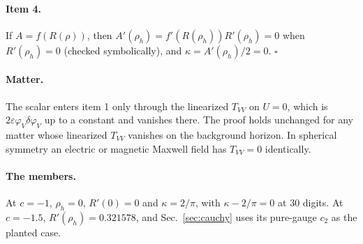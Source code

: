 \documentclass[11pt]{article}
\theoremstyle{plain}
\newcommand{\eps}{\varepsilon}
\begin{document}
\paragraph{Item 4.} If $A=f(R(\rho))$, then $A'(\rho_h)=f'(R(\rho_h))R'(\rho_h)=0$ when $R'(\rho_h)=0$ (checked symbolically),
and $\kappa=A'(\rho_h)/2=0$. $\square$

\paragraph{Matter.} The scalar enters item 1 only through the linearized $T_{VV}$ on $U=0$, which is
$2\eps\varphi_V\delta\varphi_V$ up to a constant and vanishes there. The proof holds unchanged for any matter whose
linearized $T_{VV}$ vanishes on the background horizon. In spherical symmetry an electric or magnetic Maxwell field has
$T_{VV}=0$ identically.

\paragraph{The members.} At $c=-1$, $\rho_h=0$, $R'(0)=0$ and $\kappa=2/\pi$, with $\kappa-2/\pi=0$ at 30 digits. At
$c=-1.5$, $R'(\rho_h)=0.321578$, and Sec.~\ref{sec:cauchy} uses its pure-gauge $c_2$ as the planted case.
\end{document}
